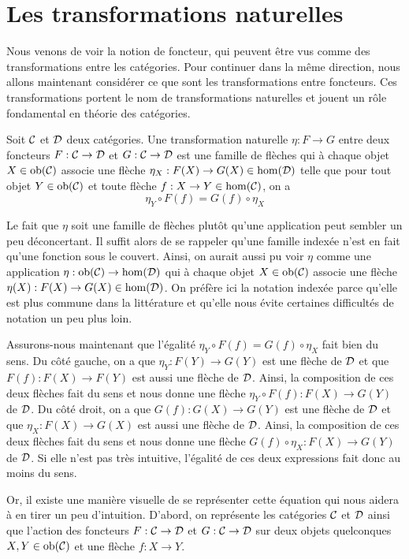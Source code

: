 \section{Les transformations naturelles}
Nous venons de voir la notion de foncteur, qui peuvent être vus comme
des transformations entre les catégories. Pour continuer dans la même
direction, nous allons maintenant considérer ce que sont les transformations
entre foncteurs. Ces transformations portent le nom de transformations
naturelles et jouent un rôle fondamental en théorie des catégories.

\begin{définition}
    Soit $\mathcal{C}$ et $\mathcal{D}$ deux catégories. Une transformation naturelle
    $\eta : F \to G$ entre deux foncteurs $F : \mathcal{C} \to \mathcal{D}$ et $G : \mathcal{C} \to \mathcal{D}$
    est une famille de flèches qui à chaque objet $X \in \mathrm{ob}(\mathcal{C})$ associe une
    flèche $\eta_X : F(X) \to G(X) \in \hom(\mathcal{D})$ telle que pour tout objet
    $Y \in \mathrm{ob}(\mathcal{C})$ et toute flèche $f : X \to Y \in \hom(\mathcal{C})$, on a
    \[
        \eta_Y \circ F(f) = G(f) \circ \eta_X
    \]
\end{définition}

Le fait que $\eta$ soit une famille de flèches plutôt qu'une application
peut sembler un peu déconcertant. Il suffit alors de se rappeler qu'une
famille indexée n'est en fait qu'une fonction sous le couvert. Ainsi, on
aurait aussi pu voir $\eta$ comme une application $\eta : \mathrm{ob}(\mathcal{C}) \to \hom(\mathcal{D})$
qui à chaque objet $X \in \mathrm{ob}(\mathcal{C})$ associe une flèche
$\eta(X) : F(X) \to G(X) \in \hom(\mathcal{D})$. On préfère ici la notation indexée
parce qu'elle est plus commune dans la littérature et qu'elle nous évite
certaines difficultés de notation un peu plus loin.

Assurons-nous maintenant que l'égalité $\eta_Y \circ F(f) = G(f) \circ \eta_X$
fait bien du sens. Du côté gauche, on a que $\eta_Y : F(Y) \to G(Y)$ est une
flèche de $\mathcal{D}$ et que $F(f) : F(X) \to F(Y)$ est aussi une flèche de $\mathcal{D}$.
Ainsi, la composition de ces deux flèches fait du sens et nous donne une flèche
$\eta_Y \circ F(f) : F(X) \to G(Y)$ de $\mathcal{D}$. Du côté droit, on a que
$G(f) : G(X) \to G(Y)$ est une flèche de $\mathcal{D}$ et que $\eta_X : F(X) \to G(X)$
est aussi une flèche de $\mathcal{D}$. Ainsi, la composition de ces deux flèches fait
du sens et nous donne une flèche $G(f) \circ \eta_X : F(X) \to G(Y)$ de $\mathcal{D}$.
Si elle n'est pas très intuitive, l'égalité de ces deux expressions fait donc
au moins du sens.

Or, il existe une manière visuelle de se représenter cette équation qui nous
aidera à en tirer un peu d'intuition. D'abord, on représente les catégories
$\mathcal{C}$ et $\mathcal{D}$ ainsi que l'action des foncteurs $F : \mathcal{C} \to \mathcal{D}$ et $G : \mathcal{C} \to \mathcal{D}$
sur deux objets quelconques $X,Y \in \mathrm{ob}(\mathcal{C})$ et une flèche $f : X \to Y$.

